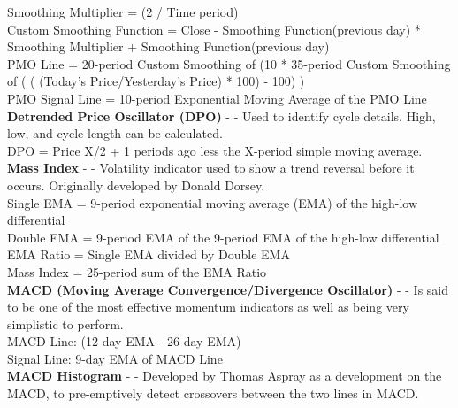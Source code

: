 \documentclass[conference]{IEEEtran}
\begin{document}
\noindent
Smoothing Multiplier = (2 / Time period)\\
Custom Smoothing Function = {Close - Smoothing Function(previous day)} * Smoothing Multiplier + Smoothing Function(previous day) \\
PMO Line = 20-period Custom Smoothing of (10 * 35-period Custom Smoothing of ( ( (Today's Price/Yesterday's Price) * 100) - 100) )\\
PMO Signal Line = 10-period Exponential Moving Average of the PMO Line\\

\noindent
\textbf{Detrended Price Oscillator (DPO)} - \cite{Murphy1999} - Used to identify cycle details. High, low, and cycle length can be calculated.\\

\noindent
DPO = Price {X/2 + 1} periods ago less the X-period simple moving average.\\

\noindent
\textbf{Mass Index} - \cite{Murphy1999} - Volatility indicator used to show a trend reversal before it occurs.  Originally developed by Donald Dorsey. \\

\noindent
Single EMA = 9-period exponential moving average (EMA) of the high-low differential \\
Double EMA = 9-period EMA of the 9-period EMA of the high-low differential \\
EMA Ratio = Single EMA divided by Double EMA \\
Mass Index = 25-period sum of the EMA Ratio \\

\noindent
\textbf{MACD (Moving Average Convergence/Divergence Oscillator)} - \cite{Appel2005} - Is said to be one of the most effective momentum indicators as well as being very simplistic to perform. \\

\noindent
MACD Line: (12-day EMA - 26-day EMA)\\
Signal Line: 9-day EMA of MACD Line\\

\noindent
\textbf{MACD Histogram} - \cite{Murphy1999} - Developed by Thomas Aspray as a development on the MACD, to pre-emptively detect crossovers between the two lines in MACD.\\
\end{document}
